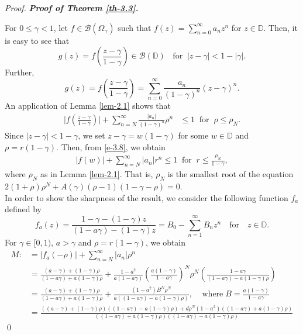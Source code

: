 \documentclass[a4paper,12pt]{amsart}
\theoremstyle{plain}
\theoremstyle{definition}
\newenvironment{pf}[1][]{%
 \vskip 3mm
 \noindent
 \ifthenelse{\equal{#1}{}}%
  {{\slshape Proof. }}%
  {{\slshape #1.} }%
 }%
{\qed\bigskip}
\begin{document}
\begin{pf}[\bf Proof of Theorem \ref{th-3.3}]
	For $ 0\leq \gamma<1 $, let $ f\in \mathcal{B}(\Omega_{\gamma}) $ such that $ f(z)=\sum_{n=0}^{\infty}a_nz^n $ for $ z\in\mathbb{D}. $ Then, it is easy to see that  
	\begin{equation*}
		g(z)=f\left(\frac{z-\gamma}{1-\gamma}\right)\in\mathcal{B}(\mathbb{D})\;\; \text{ for}\;\; |z-\gamma|<1-|\gamma|.
	\end{equation*}
Further,
\begin{equation*}
	g(z)=f\left(\frac{z-\gamma}{1-\gamma}\right)=\sum_{n=0}^{\infty}\frac{a_n}{(1-\gamma)^n}(z-\gamma)^n.
\end{equation*}
An application of Lemma \ref{lem-2.1} shows that
\begin{align} \label{e-3.8}	\bigg|f\left(\frac{z-\gamma}{1-\gamma}\right)\bigg|+\sum_{n=N}^{\infty}\frac{|a_n|}{(1-\gamma)^n}\rho^n&\leq 1\;\; \text{for}\;\; \rho\leq\rho_N.
\end{align} 
Since $|z-\gamma|<1-\gamma$, we set  $z-\gamma=w(1-\gamma)$ for some $w \in \mathbb{D}$ and $\rho = r(1-\gamma)$. Then, from \eqref{e-3.8}, we obtain 
\begin{align*}
|f(w)|+ \sum_{n=N}^{\infty} |a_{n}|r^n \leq 1 \;\; \mbox{for} \;\; r\leq \frac{\rho_{N}}{1-\gamma},
\end{align*} 
where $ \rho_N $ as in Lemma \ref{lem-2.1}. That is, $ \rho_N $ is the smallest root of the equation $ 2(1+\rho)\rho^N+A(\gamma)(\rho-1)(1-\gamma-\rho)=0. $
\\ In order to show the sharpness of the result, we consider the following function $ f_a $ defined by 
\begin{equation*}
	f_a(z)=\frac{1-\gamma-(1-\gamma)z}{(1-a\gamma)-(1-\gamma)z}=B_0-\sum_{n=1}^{\infty}B_nz^n\quad\mbox{for}\quad z\in\mathbb{D}.
\end{equation*} 
For $ \gamma\in [0,1) $, $ a>\gamma $ and $ \rho=r(1-\gamma) $, we obtain
\begin{align}\label{e-3.13}
	M:&=|f_a(-\rho)|+\sum_{n=N}^{\infty}|a_n|\rho^n\\&\nonumber=\frac{(a-\gamma)+(1-\gamma)\rho}{(1-a\gamma)+a(1-\gamma)\rho}+\frac{1-a^2}{a(1-a\gamma)}\left(\frac{a(1-\gamma)}{1-a\gamma}\right)^N\rho^N\left(\frac{1-a\gamma}{(1-a\gamma)-a(1-\gamma)\rho}\right)\\&\nonumber=\frac{(a-\gamma)+(1-\gamma)\rho}{(1-a\gamma)+a(1-\gamma)\rho}+\frac{(1-a^2)B^N\rho^N}{a\left((1-a\gamma)-a(1-\gamma)\rho\right)},\;\;\;\; \text{where}\; B=\frac{a(1-\gamma)}{1-a\gamma}\\&\nonumber=\frac{\left((a-\gamma)+(1-\gamma)\rho\right)\left((1-a\gamma)-a(1-\gamma)\rho\right)+d\rho^{N}(1-a^2)\left((1-a\gamma)+a(1-\gamma)\rho\right)}{\left((1-a\gamma)+a(1-\gamma)\rho\right)\left((1-a\gamma)-a(1-\gamma)\rho\right)}

\end{align}
\end{pf}
\end{document}
